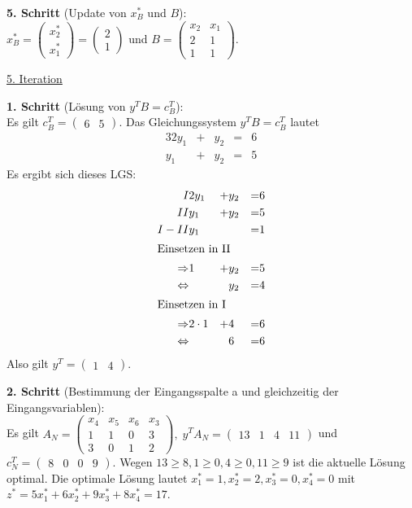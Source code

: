 \documentclass[10pt,a4paper,oneside,ngerman,numbers=noenddot]{scrartcl}
\begin{document}
		\textbf{5. Schritt} (Update von $x_{B}^{*}$ und $B$):\\
		$x_{B}^{*} = \begin{pmatrix} x_{2}^{*} \\ x_{1}^{*} \end{pmatrix} = \begin{pmatrix} 2 \\ 1 \end{pmatrix}$ und $B = \begin{pmatrix} x_{2} & x_{1} \\ 2 & 1 \\ 1 & 1 \end{pmatrix}$.
		
		\underline{5. Iteration}
		
		\textbf{1. Schritt} (Lösung von $y^{T}B = c_{B}^{T}$):\\
		Es gilt $c_{B}^{T} = \begin{pmatrix} 6 & 5 \end{pmatrix}$. Das Gleichungssystem $y^{T}B = c_{B}^{T}$ lautet
		\begin{alignat*}{3}
			2y_{1} &+& y_{2} &=& 6 \\
			y_{1} &+& y_{2} &=& 5
		\end{alignat*}
		Es ergibt sich dieses LGS:
		\begin{alignat*}{3}
			I & 2y_{1} &+& y_{2} &=& 6 \\
			II & y_{1} &+& y_{2} &=& 5 \\
			I - II & y_{1} && &=& 1 \\
			\intertext{Einsetzen in II}
			\Rightarrow & 1 &+& y_{2} &=& 5 \\
			\Leftrightarrow & && y_{2} &=& 4 \\
			\intertext{Einsetzen in I}
			\Rightarrow & 2 \cdot 1 &+& 4 &=& 6 \\
			\Leftrightarrow & && 6 &=& 6
		\end{alignat*}
		Also gilt $y^{T} = \begin{pmatrix} 1 & 4 \end{pmatrix}$.
		
		\textbf{2. Schritt} (Bestimmung der Eingangsspalte a und gleichzeitig der Eingangsvariablen):\\
		Es gilt $A_{N} = \begin{pmatrix} x_{4} & x_{5} & x_{6} & x_{3} \\ 1 & 1 & 0 & 3 \\ 3 & 0 & 1 & 2 \end{pmatrix},\; y^{T}A_{N} = \begin{pmatrix} 13 & 1 & 4 & 11 \end{pmatrix}$ und $c_{N}^{T} = \begin{pmatrix} 8 & 0 & 0 & 9\end{pmatrix}$.  Wegen $13 \geq 8, 1 \geq 0, 4 \geq 0, 11 \geq 9$ ist die aktuelle Lösung optimal. Die optimale Lösung lautet $x_{1}^{*} = 1, x_{2}^{*} = 2, x_{3}^{*} = 0, x_{4}^{*} = 0$ mit $z^{*} = 5x_{1}^{*} + 6x_{2}^{*} + 9x_{3}^{*} + 8x_{4}^{*} = 17$.
\end{document}

